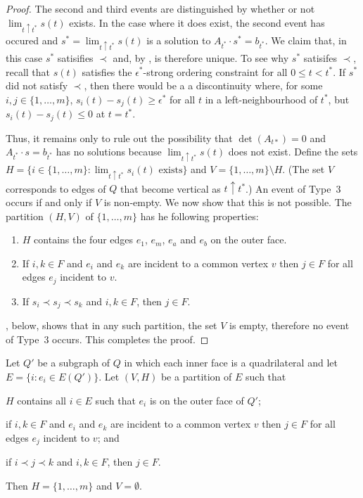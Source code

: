 \documentclass{patmorin}
\begin{document}
\begin{proof}
   The second and third events are distinguished by whether or not
   $\lim_{t\uparrow t^*} s(t)$ exists.  In the case where it does
   exist, the second event has occured and $s^*=\lim_{t\uparrow t^*}
   s(t)$ is a solution to $A_{t^*}\cdot s^*=b_{t^*}$.  We claim that,
   in this case $s^*$ satisifies $\prec$ and, by ,
   is therefore unique.  To see why $s^*$ satisifes $\prec$, recall
   that $s(t)$ satisfies the $\epsilon^*$-strong ordering constraint
   for all $0\le t<t^*$.  If $s^*$ did not satisfy $\prec$, then there
   would be a a discontinuity where, for some $i,j\in\{1,\ldots,m\}$,
   $s_i(t)-s_j(t)\ge \epsilon^*$ for all $t$ in a left-neighbourhood of
   $t^*$, but $s_i(t)-s_j(t) \le 0$ at $t=t^*$.

   Thus, it remains only to rule out the possibility that
   $\det(A_{t*})=0$ and $A_{t^*}\cdot s=b_{t^*}$ has no solutions because
   $\lim_{t\uparrow t^*} s(t)$ does not exist.  Define the sets $H=\{i\in
   \{1,\ldots,m\}:\text{$\lim_{t\uparrow t^*} s_i(t)$ exists}\}$ and
   $V=\{1,\ldots,m\}\setminus H$. (The set $V$ corresponds to edges of
   $Q$ that become vertical as $t\uparrow t^*$.)
   An event of Type~3 occurs if and only if $V$ is non-empty.
   We now show that this is not possible.  The partition
   $(H,V)$ of $\{1,\ldots,m\}$ has he following
   properties:
   \begin{enumerate}
    \item $H$ contains the four edges $e_1$, $e_m$, $e_a$ and $e_b$
      on the outer face.
    \item If $i,k\in F$ and $e_i$ and $e_k$ are incident to a common
      vertex $v$ then $j\in F$ for all edges $e_j$ incident to $v$.
    \item If $s_i \prec s_j \prec s_k$ and $i,k\in F$, 
      then $j\in F$.
   \end{enumerate}
   , below, shows that in any such partition, the set
   $V$ is empty, therefore no event of Type~3 occurs.  This 
   completes the proof.
\end{proof}

\begin{lem}
   Let $Q'$ be a subgraph of $Q$ in which each inner face is a
   quadrilateral and let $E=\{i:e_i\in E(Q')\}$.  Let $(V,H)$ be a
   partition of $E$ such that
   \begin{compactenum}
    \item $H$ contains all $i\in E$ such that $e_i$ is on the outer face 
      of $Q'$;
    \item if $i,k\in F$ and $e_i$ and $e_k$ are incident to a common
      vertex $v$ then $j\in F$ for all edges $e_j$ incident to $v$; and
    \item if $i \prec j \prec k$ and $i,k\in F$, 
      then $j\in F$.
   \end{compactenum}
   Then $H=\{1,\ldots,m\}$ and $V=\emptyset$.
\end{lem}
\end{document}
